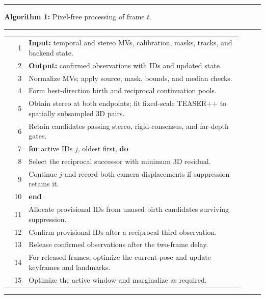 \begin{center}
\begin{minipage}{0.97\textwidth}
\hrule
\vspace{0.35em}
\textbf{Algorithm 1:} Pixel-free processing of frame $t$.
\vspace{0.35em}
\hrule
\vspace{0.25em}
\begin{tabular}{@{}r@{\hspace{0.8em}}p{0.91\linewidth}@{}}
  1 & \textbf{Input:} temporal and stereo MVs, calibration, masks, tracks, and backend state. \\
  2 & \textbf{Output:} confirmed observations with IDs and updated state. \\
  3 & Normalize MVs; apply source, mask, bounds, and median checks. \\
  4 & Form best-direction birth and reciprocal continuation pools. \\
  5 & Obtain stereo at both endpoints; fit fixed-scale TEASER++ to spatially subsampled 3D pairs. \\
  6 & Retain candidates passing stereo, rigid-consensus, and far-depth gates. \\
  7 & \textbf{for} active IDs $j$, oldest first, \textbf{do} \\
  8 & \quad Select the reciprocal successor with minimum 3D residual. \\
  9 & \quad Continue $j$ and record both camera displacements if suppression retains it. \\
 10 & \textbf{end} \\
 11 & Allocate provisional IDs from unused birth candidates surviving suppression. \\
 12 & Confirm provisional IDs after a reciprocal third observation. \\
 13 & Release confirmed observations after the two-frame delay. \\
 14 & For released frames, optimize the current pose and update keyframes and landmarks. \\
 15 & Optimize the active window and marginalize as required. \\
\end{tabular}
\vspace{0.25em}
\hrule
\end{minipage}
\end{center}
